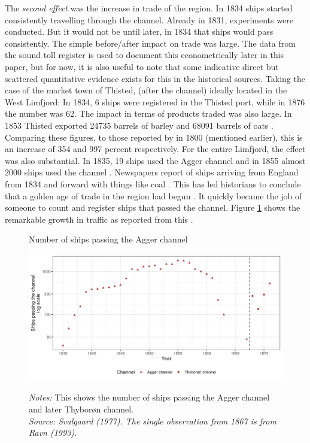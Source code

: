 \documentclass[11pt]{article}
\begin{document}
The \textit{second effect} was the increase in trade of the region. In 1834 ships started consistently travelling through the channel. Already in 1831, experiments were conducted. But it would not be until later, in 1834 that ships would pass consistently. The simple before/after impact on trade was large. The data from the sound toll register is used to document this econometrically later in this paper, but for now, it is also useful to note that some indicative direct but scattered quantitative evidence exists for this in the historical sources. Taking the case of the market town of Thisted, (after the channel) ideally located in the West Limfjord: In 1834, 6 ships were registered in the Thisted port, while in 1876 the number was 62. The impact in terms of products traded was also large. In 1853 Thisted exported 24735 barrels of barley and 68091 barrels of oats \citep[p. 153-159]{ThistedLokalhistorie1974}. Comparing these figures, to those reported by \cite{Aagard1802} in 1800 (mentioned earlier), this is an increase of 354 and 997 percent respectively. For the entire Limfjord, the effect was also substantial. In 1835, 19 ships used the Agger channel and in 1855 almost 2000 ships used the channel \citep{Svalgaard1977}. Newspapers report of ships arriving from England from 1834 and forward with things like coal \citep{ThistedAmtsavis1834, RoskildeAmt1836, ViborgStift1852}. This has led historians to conclude that a golden age of trade in the region had begun \citep{Poulsen2019, Ravn1993}. It quickly became the job of someone to count and register ships that passed the channel. Figure \ref{fig:channel} shows the remarkable growth in traffic as reported from this \citep{Svalgaard1977}.


\begin{figure}[ht]
\begin{center}
  \caption{Number of ships passing the Agger channel} \label{fig:channel}
  \includegraphics[width=1\textwidth]{Plots/Ship_trafic_channel.png}
  \parbox{0.9\textwidth}{
    \caption*{\footnotesize \textit{Notes:} This shows the number of ships passing the Agger channel and later Thyborøn channel. \\ \textit{Source: Svalgaard (1977). The single observation from 1867 is from Ravn (1993).}}
  }  
\end{center}
\end{figure}
\end{document}

